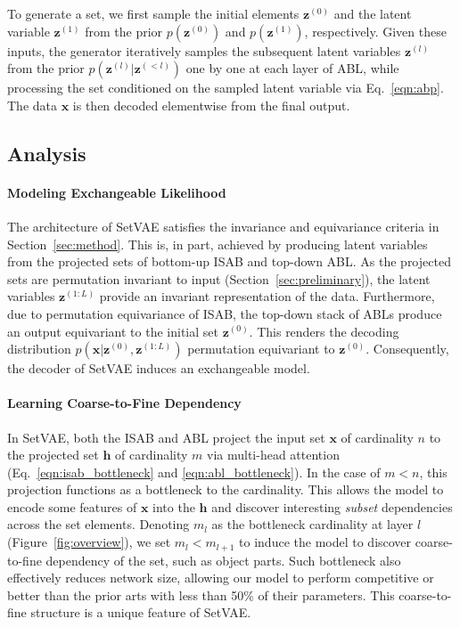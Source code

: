 \documentclass[final]{arxiv/cvpr}
\newcommand{\cutparagraphup}{\vspace*{-0.1in}}
\begin{document}
To generate a set, we first sample the initial elements $\mathbf{z}^{(0)}$ and the latent variable $\mathbf{z}^{(1)}$ from the prior $p(\mathbf{z}^{(0)})$ and $p(\mathbf{z}^{(1)})$, respectively. 
Given these inputs, the generator iteratively samples the subsequent latent variables $\mathbf{z}^{(l)}$ from the prior $p(\mathbf{z}^{(l)}|\mathbf{z}^{(<l)})$ one by one at each layer of ABL, while processing the set conditioned on the sampled latent variable via Eq.~\eqref{eqn:abp}. 
The data $\mathbf{x}$ is then decoded elementwise from the final output.

\subsection{Analysis}
\paragraph{Modeling Exchangeable Likelihood}
The architecture of SetVAE satisfies the invariance and equivariance criteria in Section~\ref{sec:method}.
This is, in part, achieved by producing latent variables from the projected sets of bottom-up ISAB and top-down ABL.
As the projected sets are permutation invariant to input (Section~\ref{sec:preliminary}), the latent variables $\mathbf{z}^{(1:L)}$ provide an invariant representation of the data.
Furthermore, due to permutation equivariance of ISAB, the top-down stack of ABLs produce an output equivariant to the initial set $\mathbf{z}^{(0)}$. This renders the decoding distribution $p(\mathbf{x}|\mathbf{z}^{(0)}, \mathbf{z}^{(1:L)})$ permutation equivariant to $\mathbf{z}^{(0)}$.
Consequently, the decoder of SetVAE induces an exchangeable model.

\cutparagraphup
\paragraph{Learning Coarse-to-Fine Dependency}
In SetVAE, both the ISAB and ABL project the input set $\mathbf{x}$ of cardinality $n$ to the projected set $\mathbf{h}$ of cardinality $m$ via multi-head attention (Eq.~\eqref{eqn:isab_bottleneck} and \eqref{eqn:abl_bottleneck}).
In the case of $m<n$, this projection functions as a bottleneck to the cardinality.
This allows the model to encode some features of $\mathbf{x}$ into the $\mathbf{h}$ and discover interesting \emph{subset} dependencies across the set elements.
Denoting $m_l$ as the bottleneck cardinality at layer $l$ (Figure~\ref{fig:overview}), we set $m_{l}<m_{l+1}$ to induce the model to discover coarse-to-fine dependency of the set, such as object parts.
Such bottleneck also effectively reduces network size, allowing our model to perform competitive or better than the prior arts with less than 50\% of their parameters.
This coarse-to-fine structure is a unique feature of SetVAE.
\end{document}
